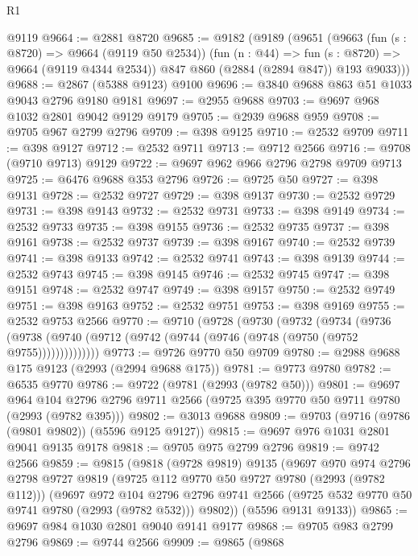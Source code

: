 \begin{lexlean}{R1}
\begin{coremodule}
    @9119
@9664 := @2881 @8720
@9685 := @9182
    (@9189
      (@9651
        (@9663
          (fun (s : @8720) => @9664 (@9119 @50 @2534))
          (fun (n : @44) => fun (s : @8720) => @9664 (@9119 @4344 @2534))
          @847
          @860
          (@2884 (@2894 @847))
          @193
          @9033)))
@9688 := @2867 (@5388 @9123) @9100
@9696 := @3840 @9688 @863 @51 @1033 @9043 @2796 @9180 @9181
@9697 := @2955 @9688
@9703 := @9697 @968 @1032 @2801 @9042 @9129 @9179
@9705 := @2939 @9688 @959
@9708 := @9705 @967 @2799 @2796
@9709 := @398 @9125
@9710 := @2532 @9709
@9711 := @398 @9127
@9712 := @2532 @9711
@9713 := @9712 @2566
@9716 := @9708 (@9710 @9713) @9129
@9722 := @9697 @962 @966 @2796 @2798 @9709 @9713
@9725 := @6476 @9688 @353 @2796
@9726 := @9725 @50
@9727 := @398 @9131
@9728 := @2532 @9727
@9729 := @398 @9137
@9730 := @2532 @9729
@9731 := @398 @9143
@9732 := @2532 @9731
@9733 := @398 @9149
@9734 := @2532 @9733
@9735 := @398 @9155
@9736 := @2532 @9735
@9737 := @398 @9161
@9738 := @2532 @9737
@9739 := @398 @9167
@9740 := @2532 @9739
@9741 := @398 @9133
@9742 := @2532 @9741
@9743 := @398 @9139
@9744 := @2532 @9743
@9745 := @398 @9145
@9746 := @2532 @9745
@9747 := @398 @9151
@9748 := @2532 @9747
@9749 := @398 @9157
@9750 := @2532 @9749
@9751 := @398 @9163
@9752 := @2532 @9751
@9753 := @398 @9169
@9755 := @2532 @9753 @2566
@9770 := @9710
    (@9728
      (@9730
        (@9732
          (@9734
            (@9736
              (@9738 (@9740 (@9712 (@9742 (@9744 (@9746 (@9748 (@9750 (@9752 @9755))))))))))))))
@9773 := @9726 @9770 @50 @9709
@9780 := @2988 @9688 @175 @9123 (@2993 (@2994 @9688 @175))
@9781 := @9773 @9780
@9782 := @6535 @9770
@9786 := @9722 (@9781 (@2993 (@9782 @50)))
@9801 := @9697
    @964
    @104
    @2796
    @2796
    @9711
    @2566
    (@9725 @395 @9770 @50 @9711 @9780 (@2993 (@9782 @395)))
@9802 := @3013 @9688
@9809 := @9703 (@9716 (@9786 (@9801 @9802)) (@5596 @9125 @9127))
@9815 := @9697 @976 @1031 @2801 @9041 @9135 @9178
@9818 := @9705 @975 @2799 @2796
@9819 := @9742 @2566
@9859 := @9815
    (@9818
      (@9728 @9819)
      @9135
      (@9697
        @970
        @974
        @2796
        @2798
        @9727
        @9819
        (@9725 @112 @9770 @50 @9727 @9780 (@2993 (@9782 @112)))
        (@9697
          @972
          @104
          @2796
          @2796
          @9741
          @2566
          (@9725 @532 @9770 @50 @9741 @9780 (@2993 (@9782 @532)))
          @9802))
      (@5596 @9131 @9133))
@9865 := @9697 @984 @1030 @2801 @9040 @9141 @9177
@9868 := @9705 @983 @2799 @2796
@9869 := @9744 @2566
@9909 := @9865
    (@9868

\end{coremodule}
\end{lexlean}
